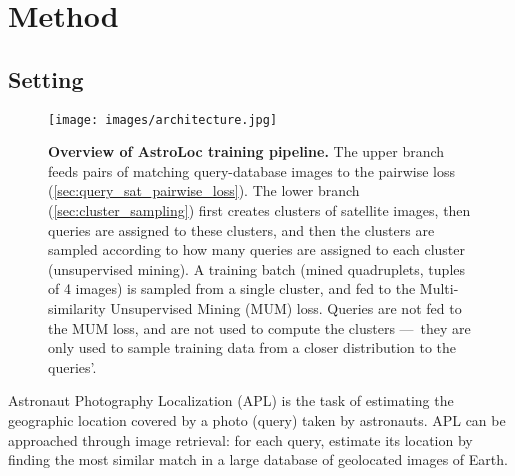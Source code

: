 
\section{Method}
\label{sec:method}

\subsection{Setting}
\label{sec:setting}

\begin{figure*}
    \begin{center}
    \texttt{[image: images/architecture.jpg]}
    \end{center}
    \vspace{-5mm}
    \caption{\textbf{Overview of AstroLoc training pipeline.}
    The upper branch feeds pairs of matching query-database images to the pairwise loss (\cref{sec:query_sat_pairwise_loss}).
    The lower branch (\cref{sec:cluster_sampling}) first creates clusters of satellite images, then queries are assigned to these clusters, and then the clusters are sampled according to how many queries are assigned to each cluster (unsupervised mining).
    A training batch (mined quadruplets, \ie tuples of 4 images) is sampled from a single cluster, and fed to the Multi-similarity Unsupervised Mining (MUM) loss.
    Queries are not fed to the MUM loss, and are not used to compute the clusters ---~they are only used to sample training data from a closer distribution to the queries'.
    }
    \vspace{-5mm}
    \label{fig:architecture}
\end{figure*}

Astronaut Photography Localization (APL) is the task of estimating the geographic location covered by a photo (query) taken by astronauts.
APL can be approached through image retrieval: for each query, estimate its location by finding the most similar match in a large database of geolocated images of Earth.


